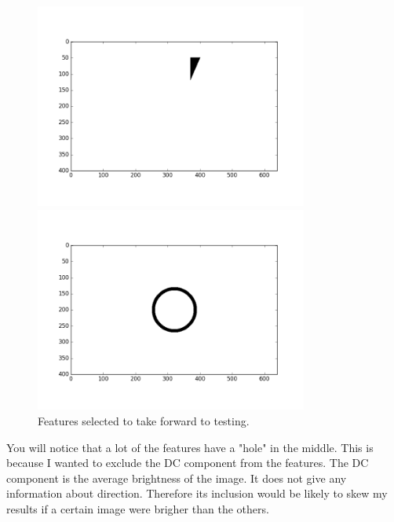 \documentclass[11pt, a4paper]{article}
\begin{document}
\begin{figure}[ht]
\begin{minipage}[b]{0.3\textwidth}
	\end{minipage}
	\begin{minipage}[b]{0.3\textwidth}
		\includegraphics[trim={2cm 2cm 2cm 2cm},clip,width=0.8\textwidth]{features/triangle.png}
	\end{minipage}
	\begin{minipage}[b]{0.3\textwidth}
		\includegraphics[trim={2cm 2cm 2cm 2cm},clip,width=0.8\textwidth]{features/ring.png}
	\end{minipage}
	\caption{Features selected to take forward to testing.}
	\label{fig:features}
\end{figure}
You will notice that a lot of the features have a "hole" in the middle. This is because I wanted to exclude the DC component from the features. The DC component is the average brightness of the image. It does not give any information about direction. Therefore its inclusion would be likely to skew my results if a certain image were brigher than the others. 
\end{document}
